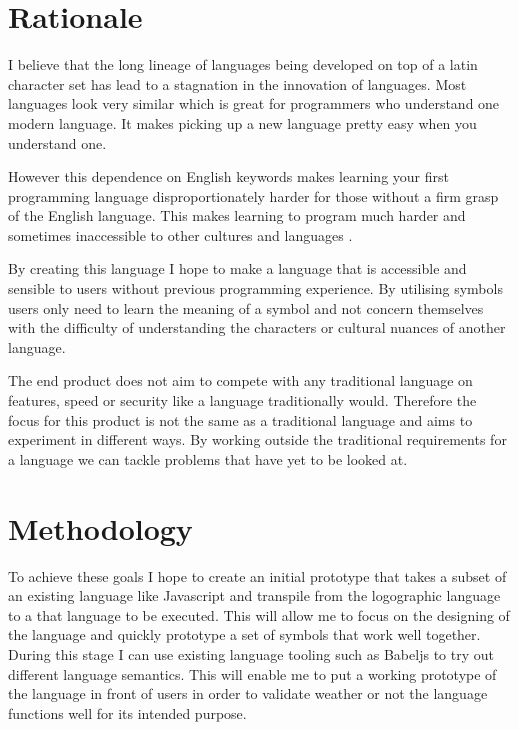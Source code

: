 \documentclass[12pt]{article}
\begin{document}
\section{Rationale}

I believe that the long lineage of languages being developed on top of a latin character set
has lead to a stagnation in the innovation of languages. Most languages look very similar which is
great for programmers who understand one modern language. It makes picking up a new language pretty easy
when you understand one.

However this dependence on English keywords makes learning your first programming language disproportionately harder
for those without a firm grasp of the English language. This makes learning to program much harder and sometimes
inaccessible to other cultures and languages \parencite{7026875}. 

By creating this language I hope to make a language that is accessible and sensible to users without previous
programming experience. By utilising symbols users only need to learn the meaning of a symbol and not concern themselves
with the difficulty of understanding the characters or cultural nuances \parencite{Eastman:1982:CEN:358728.358756} of another language.

The end product does not aim to compete with any traditional language on features, speed or security like a language traditionally would.
Therefore the focus for this product is not the same as a traditional language and aims to experiment in different ways.
By working outside the traditional requirements for a language we can tackle problems that have yet to be looked at.

\section{Methodology}


To achieve these goals I hope to create an initial prototype that takes a subset of an existing language like Javascript and transpile from the logographic 
language to a that language to be executed. This will allow me to focus on the designing of the language and quickly prototype a set of symbols that work well together.
During this stage I can use existing language tooling such as Babeljs \parencite{noauthor_babel_nodate} to try out different language semantics. This will enable me to put a working prototype of the language in front of
users in order to validate weather or not the language functions well for its intended purpose.
\end{document}
